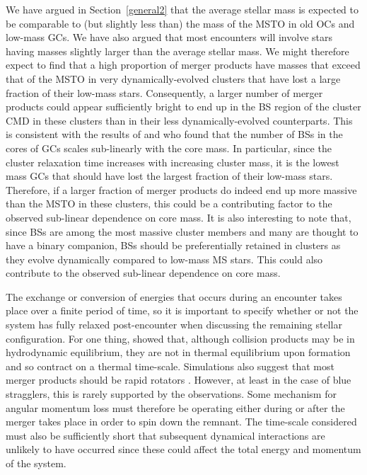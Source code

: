 We have argued in Section~\ref{general2} that the average stellar 
mass is expected to be comparable to (but slightly less than) the mass
of the MSTO in old OCs and 
low-mass GCs.  We have also argued that most encounters will involve
stars having masses slightly larger than the average stellar mass.  We
might therefore expect to 
find that a high proportion of merger products have masses that
exceed that of the MSTO in very dynamically-evolved clusters that have
lost a large fraction of their low-mass stars.  Consequently, a larger 
number of merger products could appear sufficiently bright to
end up in the BS region of the cluster CMD in these clusters than in
their less dynamically-evolved counterparts.  This 
is consistent with the results of \citet{knigge09} and
\citet{leigh09} 
who found that the number of BSs in the cores of GCs scales
sub-linearly with the core mass.  In particular, since the cluster
relaxation time 
increases with increasing cluster mass, it is the lowest mass GCs that
should have lost the largest fraction of their low-mass stars.
Therefore, if a larger fraction of merger products do indeed end up
more massive than the MSTO in these clusters, this could be a
contributing factor to the observed sub-linear dependence on core
mass.  It is also interesting to note that, since BSs are among the
most massive cluster members and many are thought to have a binary
companion, BSs should be preferentially retained in clusters as they
evolve dynamically compared to low-mass MS stars.  This could also
contribute to the observed sub-linear dependence on core mass.  

The exchange or conversion of energies that occurs during an
encounter takes place over a finite period of time, so it is important to
specify whether or not the system has fully relaxed
post-encounter when discussing the remaining stellar configuration.
For one thing, \citet{sills01} showed that, although collision
products may be in hydrodynamic equilibrium, they are not in thermal
equilibrium upon formation and so contract on a thermal time-scale.
Simulations also suggest that most merger products should be rapid
rotators \citep{sills02, sills05}.  However, at least in the case of
blue stragglers, this is
rarely supported by the observations.  Some mechanism for
angular momentum loss must therefore be operating either during or
after the merger takes place in order to spin down the remnant.
The time-scale
considered must also be sufficiently short that subsequent dynamical
interactions are unlikely to have occurred since these could affect
the total energy and momentum of the system.  

